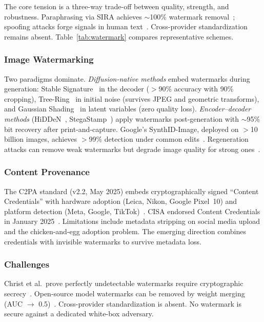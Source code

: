 The core tension is a three-way trade-off between quality, strength, and robustness. Paraphrasing via SIRA achieves $\sim$100\% watermark removal~\cite{cheng2025sira}; spoofing attacks forge signals in human text~\cite{sadasivan2023spoofing}. Cross-provider standardization remains absent. Table~\ref{tab:watermark} compares representative schemes.

\subsubsection{Image Watermarking}
\label{sec:wm-image}

Two paradigms dominate. \emph{Diffusion-native methods} embed watermarks during generation: Stable Signature~\cite{fernandez2023stablesig} in the decoder ($>$90\% accuracy with 90\% cropping), Tree-Ring~\cite{wen2023treering} in initial noise (survives JPEG and geometric transforms), and Gaussian Shading~\cite{yang2024gaussianshading} in latent variables (zero quality loss). \emph{Encoder--decoder methods} (HiDDeN~\cite{zhu2018hidden}, StegaStamp~\cite{tancik2020stegastamp}) apply watermarks post-generation with $\sim$95\% bit recovery after print-and-capture. Google's SynthID-Image, deployed on $>$10 billion images, achieves $>$99\% detection under common edits~\cite{gowal2024synthidimage}. Regeneration attacks can remove weak watermarks but degrade image quality for strong ones~\cite{zhao2023regeneration}.

\subsubsection{Content Provenance}
\label{sec:provenance}

The C2PA standard (v2.2, May 2025) embeds cryptographically signed ``Content Credentials'' with hardware adoption (Leica, Nikon, Google Pixel~10) and platform detection (Meta, Google, TikTok)~\cite{c2pa2025}. CISA endorsed Content Credentials in January 2025~\cite{cisa2025cc}. Limitations include metadata stripping on social media upload and the chicken-and-egg adoption problem. The emerging direction combines credentials with invisible watermarks to survive metadata loss.

\subsubsection{Challenges}
\label{sec:wm-challenges}

Christ et al.\ prove perfectly undetectable watermarks require cryptographic secrecy~\cite{christ2024undetectable}. Open-source model watermarks can be removed by weight merging (AUC $\to$ 0.5)~\cite{xu2025removal}. Cross-provider standardization is absent. No watermark is secure against a dedicated white-box adversary.

